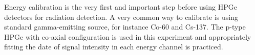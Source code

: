 Energy calibration is the very first and important step before using HPGe detectors for radiation detection. A very common way to calibrate is using standard gamma-emitting source, for instance Co-60 and Cs-137. The p-type HPGe with co-axial configuration is used in this experiment and appropriately fitting the date of signal intensity in each energy channel is practiced.
